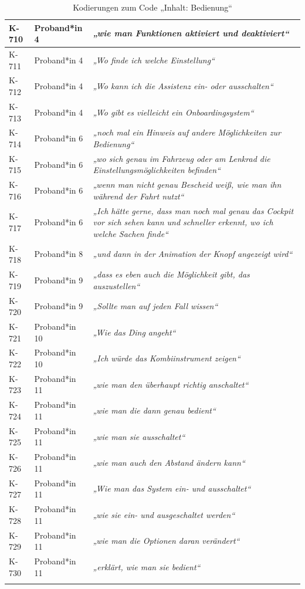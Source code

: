 {\begin{xltabular}{\textwidth}{
    |P{0.10\textwidth}
    |P{0.17\textwidth}
    |Y|
}
K-710 & Proband*in 4 & \textit{„wie man Funktionen aktiviert und deaktiviert“} \\
\hline
K-711 & Proband*in 4 & \textit{„Wo finde ich welche Einstellung“} \\
\hline
K-712 & Proband*in 4 & \textit{„Wo kann ich die Assistenz ein- oder ausschalten“} \\
\hline
K-713 & Proband*in 4 & \textit{„Wo gibt es vielleicht ein Onboardingsystem“} \\
\hline
K-714 & Proband*in 6 & \textit{„noch mal ein Hinweis auf andere Möglichkeiten zur Bedienung“} \\
\hline
K-715 & Proband*in 6 & \textit{„wo sich genau im Fahrzeug oder am Lenkrad die Einstellungsmöglichkeiten befinden“} \\
\hline
K-716 & Proband*in 6 & \textit{„wenn man nicht genau Bescheid weiß, wie man ihn während der Fahrt nutzt“} \\
\hline
K-717 & Proband*in 6 & \textit{„Ich hätte gerne, dass man noch mal genau das Cockpit vor sich sehen kann und schneller erkennt, wo ich welche Sachen finde“} \\
\hline
K-718 & Proband*in 8 & \textit{„und dann in der Animation der Knopf angezeigt wird“} \\
\hline
K-719 & Proband*in 9 & \textit{„dass es eben auch die Möglichkeit gibt, das auszustellen“} \\
\hline
K-720 & Proband*in 9 & \textit{„Sollte man auf jeden Fall wissen“} \\
\hline
K-721 & Proband*in 10 & \textit{„Wie das Ding angeht“} \\
\hline
K-722 & Proband*in 10 & \textit{„Ich würde das Kombiinstrument zeigen“} \\
\hline
K-723 & Proband*in 11 & \textit{„wie man den überhaupt richtig anschaltet“} \\
\hline
K-724 & Proband*in 11 & \textit{„wie man die dann genau bedient“} \\
\hline
K-725 & Proband*in 11 & \textit{„wie man sie ausschaltet“} \\
\hline
K-726 & Proband*in 11 & \textit{„wie man auch den Abstand ändern kann“} \\
\hline
K-727 & Proband*in 11 & \textit{„Wie man das System ein- und ausschaltet“} \\
\hline
K-728 & Proband*in 11 & \textit{„wie sie ein- und ausgeschaltet werden“} \\
\hline
K-729 & Proband*in 11 & \textit{„wie man die Optionen daran verändert“} \\
\hline
K-730 & Proband*in 11 & \textit{„erklärt, wie man sie bedient“} \\
\hline
\caption{Kodierungen zum Code „Inhalt: Bedienung“}\label{tab:kodiernachweis-inhalt-bedienung}\\
\end{xltabular}
}

